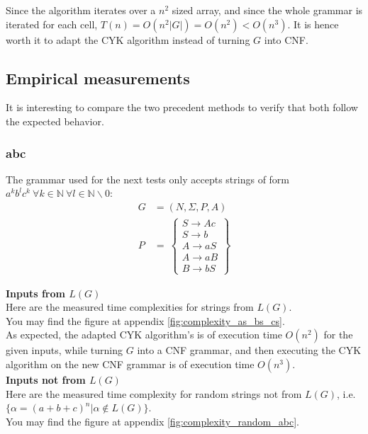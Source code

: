 \documentclass[twocolumn]{article}
\begin{document}
Since the algorithm iterates over a $n^2$ sized array, and since the whole grammar is iterated for each cell, $T(n)=O(n^2|G|)=O(n^2)<O(n^3)$. It is hence worth it to adapt the CYK algorithm instead of turning $G$ into CNF.

\subsection{Empirical measurements}
It is interesting to compare the two precedent methods to verify that both follow the expected behavior.

\subsubsection{abc}
The grammar used for the next tests only accepts strings of form $a^kb^lc^k\ \forall k\in \mathbb{N}\ \forall l\in\mathbb{N}\backslash 0$:\\
\begin{align*}
  G&=(N,\Sigma,P,A)\\
  P&=\
  \left\{ \begin{array}{l}
    S\rightarrow Ac\\
    S\rightarrow b\\
    A\rightarrow aS\\
    A\rightarrow aB\\
    B\rightarrow bS
  \end{array}\right\}
\end{align*}

\textbf{Inputs from $L(G)$}\\
Here are the measured time complexities for strings from $L(G)$.\\
You may find the figure at appendix \ref{fig:complexity_as_bs_cs}.
\\

As expected, the adapted CYK algorithm's is of execution time $O(n^2)$ for the given inputs, while
turning $G$ into a CNF grammar, and then executing the CYK algorithm on the new
CNF grammar is of execution time $O(n^3)$.
\\

\textbf{Inputs not from $L(G)$}\\
Here are the measured time complexity for random strings not from $L(G)$, i.e. $\{\alpha=(a+b+c)^n|\alpha\notin L(G)\}$.\\
You may find the figure at appendix \ref{fig:complexity_random_abc}.
\\
\end{document}
